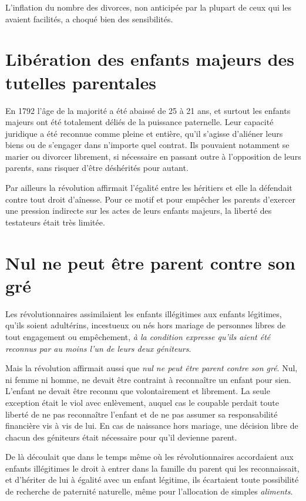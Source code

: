  L'inflation du nombre des divorces, non anticipée par la plupart de ceux qui les avaient facilités, a choqué bien des sensibilités.


\section{Libération des enfants majeurs des tutelles parentales}

 En 1792 l'âge de la majorité a été abaissé de 25 à 21 ans, et surtout les enfants majeurs ont été totalement déliés de la puissance paternelle. Leur capacité juridique a été reconnue comme pleine et entière, qu'il s'agisse d'aliéner leurs biens ou de s'engager dans n'importe quel contrat. Ils pouvaient notamment se marier ou divorcer librement, si nécessaire en passant outre à l'opposition de leurs parents, sans risquer d'être déshérités pour autant. 

 Par ailleurs la révolution affirmait l'égalité entre les héritiers et elle la défendait contre tout droit d'aînesse. Pour ce motif et pour empêcher les parents d'exercer une pression indirecte sur les actes de leurs enfants majeurs, la liberté des testateurs était très limitée.


\section{Nul ne peut être parent contre son gré}

 Les révolutionnaires assimilaient les enfants illégitimes aux enfants légitimes, qu'ils soient adultérins, incestueux ou nés hors mariage de personnes libres de tout engagement ou empêchement, \emph{à la condition expresse qu'ils aient été reconnus par au moins l'un de leurs deux géniteurs}. 

 Mais la révolution affirmait aussi que \emph{nul ne peut être parent contre son gré}. Nul, ni femme ni homme, ne devait être contraint à reconnaître un enfant pour sien. L'enfant ne devait être reconnu que volontairement et librement. La seule exception était le viol avec enlèvement, auquel cas le coupable perdait toute liberté de ne pas reconnaître l'enfant et de ne pas assumer sa responsabilité financière vis à vis de lui. En cas de naissance hors mariage, une décision libre de chacun des géniteurs était nécessaire pour qu'il devienne parent. 

 De là découlait que dans le temps même où les révolutionnaires accordaient aux enfants illégitimes le droit à entrer dans la famille du parent qui les reconnaissait, et d'hériter de lui à égalité avec un enfant légitime, ils écartaient toute possibilité de recherche de paternité naturelle, même pour l'allocation de simples \emph{aliments}. 

